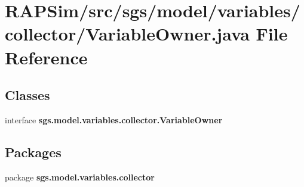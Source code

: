 \section{R\-A\-P\-Sim/src/sgs/model/variables/collector/\-Variable\-Owner.java File Reference}
\label{_variable_owner_8java}
\subsection*{Classes}
\begin{DoxyCompactItemize}
\item 
interface {\bf sgs.\-model.\-variables.\-collector.\-Variable\-Owner}
\end{DoxyCompactItemize}
\subsection*{Packages}
\begin{DoxyCompactItemize}
\item 
package {\bf sgs.\-model.\-variables.\-collector}
\end{DoxyCompactItemize}

